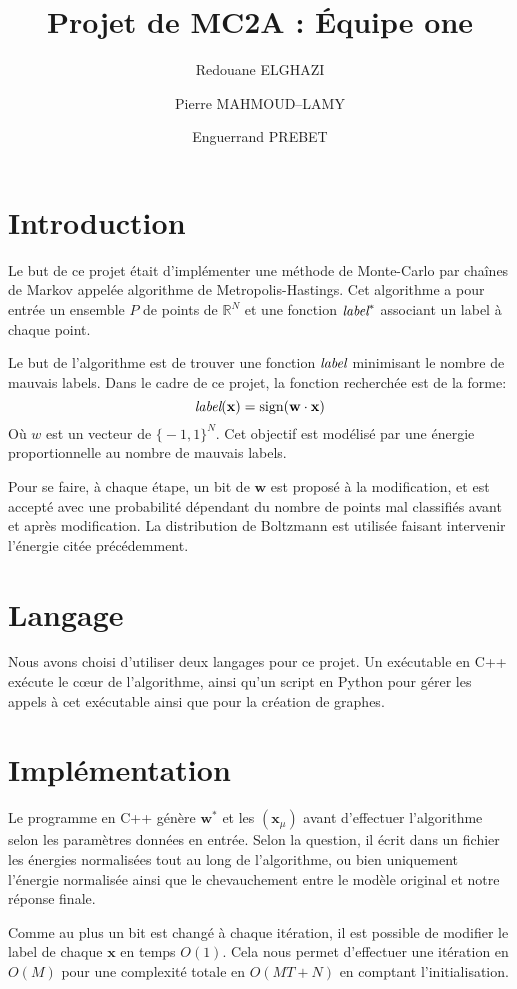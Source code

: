 \documentclass[twocolumn]{article}
\date{}
\author{Redouane ELGHAZI \and Pierre MAHMOUD--LAMY \and Enguerrand PREBET}
\title{Projet de MC2A : Équipe one}
\begin{document}
	\maketitle
	\section{Introduction}
		Le but de ce projet était d'implémenter une méthode de Monte-Carlo par chaînes de Markov appelée algorithme de Metropolis-Hastings. Cet algorithme a pour entrée un ensemble $P$ de points de $\mathbb{R}^N$ et une fonction $\emph{label}^*$ associant un label à chaque point.
		
		Le but de l'algorithme est de trouver une fonction $\emph{label}$ minimisant le nombre de mauvais labels. Dans le cadre de ce projet, la fonction recherchée est de la forme:
		$$\emph{label}(\mathbf{x}) = \text{sign}(\mathbf{w}\cdot \mathbf{x})$$
		Où $w$ est un vecteur de $\big\{{-}1,1\big\}^N$. Cet objectif est modélisé par une énergie proportionnelle au nombre de mauvais labels.
		
		Pour se faire, à chaque étape, un bit de $\mathbf{w}$ est proposé à la modification, et est accepté avec une probabilité dépendant du nombre de points mal classifiés avant et après modification. La distribution de Boltzmann est utilisée faisant intervenir l'énergie citée précédemment.
	\section{Langage}
		Nous avons choisi d'utiliser deux langages pour ce projet. Un exécutable en C++ exécute le cœur de l'algorithme, ainsi qu'un script en Python pour gérer les appels à cet exécutable ainsi que pour la création de graphes.
		
	\section{Implémentation}
		Le programme en C++ génère $\mathbf{w}^*$ et les $(\mathbf{x}_\mu)$ avant d'effectuer l'algorithme selon les paramètres données en entrée. Selon la question, il écrit dans un fichier les énergies normalisées tout au long de l'algorithme, ou bien uniquement l'énergie normalisée ainsi que le chevauchement entre le modèle original et notre réponse finale.
		
		Comme au plus un bit est changé à chaque itération, il est possible de modifier le label de chaque $\mathbf{x}$ en temps $O(1)$. Cela nous permet d'effectuer une itération en $O(M)$ pour une complexité totale en $O(MT + N)$ en comptant l'initialisation.
		
\end{document}

